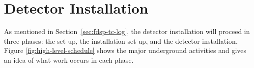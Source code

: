 \section{Detector Installation}
\label{sec:fdsp-tc-inst}



As mentioned in Section~\ref{sec:fdsp-tc-log}, the  detector installation will proceed in three phases: the  set up, the installation set up, and the detector installation. Figure \ref{fig:high-level-schedule} shows the major underground activities and gives an idea of what work occurs in each phase. 


